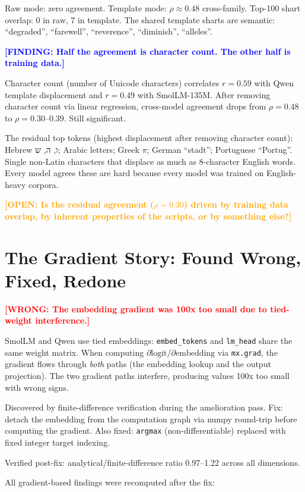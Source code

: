 \documentclass[11pt]{article}
\newcommand{\finding}[1]{\textcolor{blue}{\textbf{[FINDING: #1]}}}
\newcommand{\wrong}[1]{\textcolor{red}{\textbf{[WRONG: #1]}}}
\newcommand{\open}[1]{\textcolor{orange}{\textbf{[OPEN: #1]}}}
\begin{document}
Raw mode: zero agreement. Template mode: $\rho \approx 0.48$ cross-family. Top-100 shart overlap: 0 in raw, 7 in template. The shared template sharts are semantic: ``degraded'', ``farewell'', ``reverence'', ``diminish'', ``alleles''.

\finding{Half the agreement is character count. The other half is training data.}

Character count (number of Unicode characters) correlates $r = 0.59$ with Qwen template displacement and $r = 0.49$ with SmolLM-135M. After removing character count via linear regression, cross-model agreement drops from $\rho = 0.48$ to $\rho = 0.30$--$0.39$. Still significant.

The residual top tokens (highest displacement after removing character count): Hebrew \texthebrew{ו}, \texthebrew{ה}, \texthebrew{ש}; Arabic letters; Greek $\pi$; German ``stadt''; Portuguese ``Portug''. Single non-Latin characters that displace as much as 8-character English words. Every model agrees these are hard because every model was trained on English-heavy corpora.

\open{Is the residual agreement ($\rho = 0.30$) driven by training data overlap, by inherent properties of the scripts, or by something else?}

\section{The Gradient Story: Found Wrong, Fixed, Redone}

\wrong{The embedding gradient was 100x too small due to tied-weight interference.}

SmolLM and Qwen use tied embeddings: \texttt{embed\_tokens} and \texttt{lm\_head} share the same weight matrix. When computing $\partial \text{logit} / \partial \text{embedding}$ via \texttt{mx.grad}, the gradient flows through \emph{both} paths (the embedding lookup and the output projection). The two gradient paths interfere, producing values 100x too small with wrong signs.

Discovered by finite-difference verification during the amelioration pass. Fix: detach the embedding from the computation graph via numpy round-trip before computing the gradient. Also fixed: \texttt{argmax} (non-differentiable) replaced with fixed integer target indexing.

Verified post-fix: analytical/finite-difference ratio 0.97--1.22 across all dimensions.

All gradient-based findings were recomputed after the fix:
\end{document}
